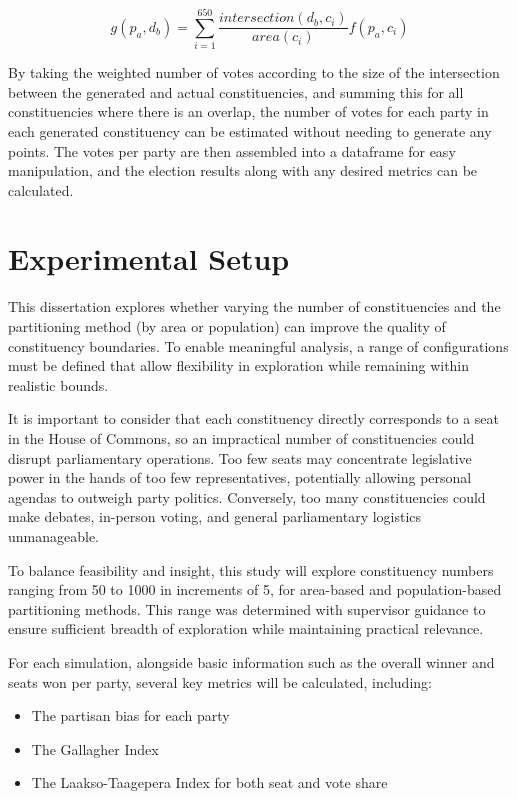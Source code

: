 \documentclass{article}
\begin{document}
\begin{equation}
    g(p_a, d_b) = \sum_{i=1}^{650} \frac{intersection(d_b, c_i)}{area(c_i)}f(p_a, c_i)
    \label{eq:g}
\end{equation}

By taking the weighted number of votes according to the size of the intersection between the generated and actual constituencies, and summing this for all constituencies
where there is an overlap, the number of votes for each party in each generated constituency can be estimated without needing to generate any points.
The votes per party are then assembled into a dataframe for easy manipulation, and the election results along with any desired metrics can be calculated.

\section{Experimental Setup}

This dissertation explores whether varying the number of constituencies and the partitioning method (by area or population) can improve the quality of constituency boundaries. 
To enable meaningful analysis, a range of configurations must be defined that allow flexibility in exploration while remaining within realistic bounds.

It is important to consider that each constituency directly corresponds to a seat in the House of Commons, so an impractical number of constituencies could disrupt parliamentary operations.
Too few seats may concentrate legislative power in the hands of too few representatives, potentially allowing personal agendas to outweigh party politics. Conversely, too many constituencies
could make debates, in-person voting, and general parliamentary logistics unmanageable.

To balance feasibility and insight, this study will explore constituency numbers ranging from 50 to 1000 in increments of 5, for area-based and population-based partitioning methods.
This range was determined with supervisor guidance to ensure sufficient breadth of exploration while maintaining practical relevance.

For each simulation, alongside basic information such as the overall winner and seats won per party, several key metrics will be calculated, including:

\begin{itemize}
    \item The partisan bias for each party 
    \item The Gallagher Index
    \item The Laakso-Taagepera Index for both seat and vote share
\end{itemize}
\end{document}
